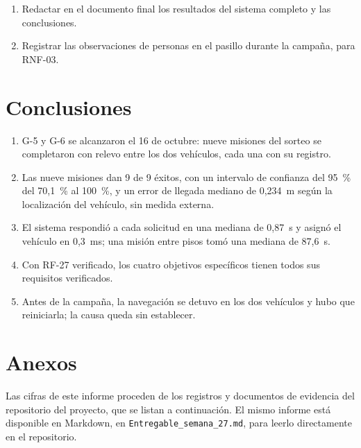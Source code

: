 \documentclass[12pt,letterpaper]{article}
\begin{document}
\begin{enumerate}[leftmargin=*]
    \item Redactar en el documento final los resultados del sistema completo y las conclusiones.
    \item Registrar las observaciones de personas en el pasillo durante la campaña, para RNF-03.
\end{enumerate}

\section{Conclusiones}

\begin{enumerate}[leftmargin=*]
    \item G-5 y G-6 se alcanzaron el 16 de octubre: nueve misiones del sorteo se completaron con relevo entre los dos vehículos, cada una con su registro.
    \item Las nueve misiones dan 9 de 9 éxitos, con un intervalo de confianza del 95~\% del 70,1~\% al 100~\%, y un error de llegada mediano de 0,234~m según la localización del vehículo, sin medida externa.
    \item El sistema respondió a cada solicitud en una mediana de 0,87~s y asignó el vehículo en 0,3~ms; una misión entre pisos tomó una mediana de 87,6~s.
    \item Con RF-27 verificado, los cuatro objetivos específicos tienen todos sus requisitos verificados.
    \item Antes de la campaña, la navegación se detuvo en los dos vehículos y hubo que reiniciarla; la causa queda sin establecer.
\end{enumerate}

\section{Anexos}

Las cifras de este informe proceden de los registros y documentos de evidencia del repositorio del proyecto, que se listan a continuación. El mismo informe está disponible en Markdown, en \texttt{Entregable\_semana\_27.md}, para leerlo directamente en el repositorio.
\end{document}
